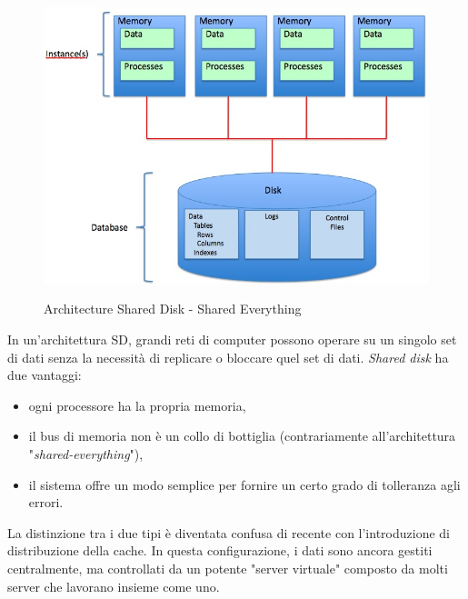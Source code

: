 \begin{figure}[htbp]
\centering
\includegraphics[scale=0.40]{img/Shared_Disk_Architecture.jpg}\\
\caption{Architecture Shared Disk - Shared Everything \label{figura1.2} \cite{etichetta7}}
\end{figure}

In un'architettura SD, grandi reti di computer possono operare su un singolo set di dati senza la necessit\`{a} di replicare o bloccare quel set di dati.\cite{etichetta7}
\textit{Shared disk} ha due vantaggi:
\begin{itemize}
\item
ogni processore ha la propria memoria, 
\item
il bus di memoria non \`{e} un collo di bottiglia (contrariamente all'architettura "\textit{shared-everything}"), 
\item 
il sistema offre un modo semplice per fornire un certo grado di tolleranza agli errori.\\
\end{itemize}
La distinzione tra i due tipi \`{e} diventata confusa di recente con l'introduzione di distribuzione della cache. In questa configurazione, i dati sono ancora gestiti centralmente, ma controllati da un potente "server virtuale" composto da molti server che lavorano insieme come uno.\cite{etichetta2}

\item
